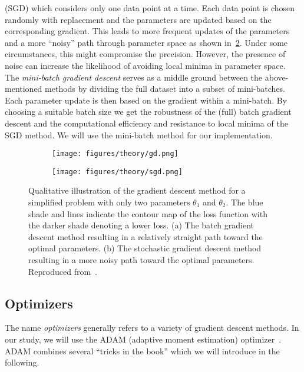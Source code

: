 (\acrshort{SGD}) which considers only one data point at a time. Each data point is chosen randomly with replacement and the parameters are updated based on the corresponding gradient. This leads to more frequent updates of the parameters and a more ``noisy'' path through parameter space as shown in~\cref{fig:sgd}. Under some circumstances, this might compromise the precision. However, the presence of noise can increase the likelihood of avoiding local minima in parameter space. The \textit{mini-batch gradient descent} serves as a middle ground between the above-mentioned methods by dividing the full dataset into a subset of mini-batches. Each parameter update is then based on the gradient within a mini-batch. By choosing a suitable batch size we get the robustness of the (full) batch gradient descent and the computational efficiency and resistance to local minima of the \acrshort{SGD} method. We will use the mini-batch method for our implementation.


\begin{figure}[!htb]
  \centering
  \begin{subfigure}[t]{0.49\textwidth}
    \centering
    \texttt{[image: figures/theory/gd.png]}
    \caption{}
    \label{fig:gd}
  \end{subfigure}
  \hfill
  \begin{subfigure}[t]{0.49\textwidth}
    \centering
    \texttt{[image: figures/theory/sgd.png]}
    \caption{}
    \label{fig:sgd}
  \end{subfigure}
  \hfill
  \caption{Qualitative illustration of the gradient descent method for a simplified problem with only two parameters $\theta_1$ and $\theta_2$. The blue shade and lines indicate the contour map of the loss function with the darker shade denoting a lower loss. (a) The batch gradient descent method resulting in a relatively straight path toward the optimal parameters. (b) The stochastic gradient descent method resulting in a more noisy path toward the optimal parameters. Reproduced from~\cite{grad_descent_analog}.}
  \label{fig:gradient_descent}
\end{figure}


\subsection{Optimizers}
The name \textit{optimizers} generally refers to a variety of gradient descent methods. In our study, we will use the ADAM (adaptive moment estimation) optimizer~\cite{kingma2017adam}. ADAM combines several ``tricks in the book'' which we will introduce in the following.

